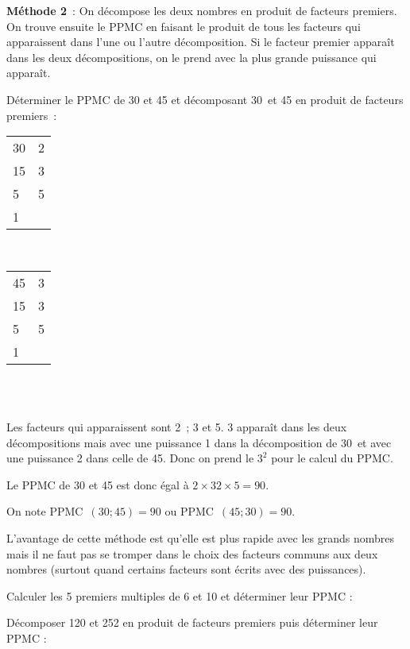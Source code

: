  \textcolor{H1}{\textbf{Méthode 2}} : On décompose les deux nombres en produit de facteurs premiers. On trouve ensuite le PPMC en faisant le produit de tous les facteurs qui apparaissent dans l'une ou l'autre décomposition. Si le facteur premier apparaît dans les deux décompositions, on le prend avec la plus grande puissance qui apparaît.
 
 
 
 \vspace{2em}

 
\begin{methode*1}

\begin{exemple*1}
Déterminer le PPMC de 30 et 45 et décomposant 30 et 45 en produit de facteurs premiers : \\[1em]
\begin{minipage}[t]{0.26\textwidth}
 \begin{tabularx}{0.3\textwidth}{X|X}
 30 & 2 \\ 
 15 & 3 \\
 5 & 5 \\
 1 & \\ 
 \end{tabularx} \\[1em]
\end{minipage} \hfill%
\begin{minipage}[t]{0.56\textwidth}
 \begin{tabularx}{0.3\textwidth}{X|X}
 45 & 3 \\ 
 15 & 3 \\
 5 & 5 \\
 1 & \\ 
 \end{tabularx} \\[1em]
 \end{minipage} \\
Les facteurs qui apparaissent sont 2 ; 3 et 5. 3 apparaît dans les deux décompositions mais avec une puissance 1 dans la décomposition de 30 et avec une puissance 2 dans celle de 45. Donc on prend le $3^2$ pour le calcul du PPMC.

Le PPMC de 30 et 45 est donc égal à $2 × 32 × 5 = 90$.

On note PPMC $(30 ; 45) = 90$ ou PPMC $(45 ; 30) = 90$. \\[-2em]
 \end{exemple*1}
 
\begin{remarque}
L'avantage de cette méthode est qu'elle est plus rapide avec les grands nombres mais il ne faut pas se tromper dans le choix des facteurs communs aux deux nombres (surtout quand certains facteurs sont écrits avec des puissances).
 \end{remarque}
 

 \exercice
Calculer les 5 premiers multiples de 6 et 10 et déterminer leur PPMC :
 


 \exercice
Décomposer 120 et 252 en produit de facteurs premiers puis déterminer leur PPMC :
 


 \end{methode*1}
 
